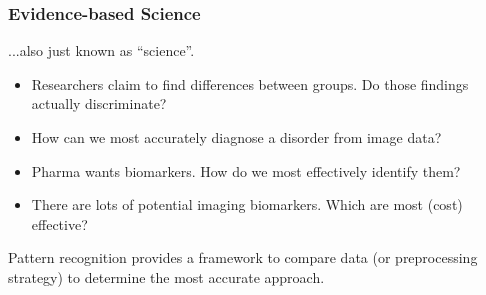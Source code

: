 \documentclass{beamer}
\begin{document}
\begin{frame}
\frametitle{Evidence-based Science}
...also just known as ``science''.
\vspace{0.5cm}
\begin{itemize}
\item{Researchers claim to find differences between groups.  Do those findings actually discriminate?}
\item{How can we most accurately diagnose a disorder from image data?}
\item{Pharma wants biomarkers.  How do we most effectively identify them?}
\item{There are lots of potential imaging biomarkers.  Which are most (cost) effective?}
\end{itemize}

Pattern recognition provides a framework to compare data (or preprocessing strategy) to determine the most accurate approach.
\end{frame}


\end{document}
